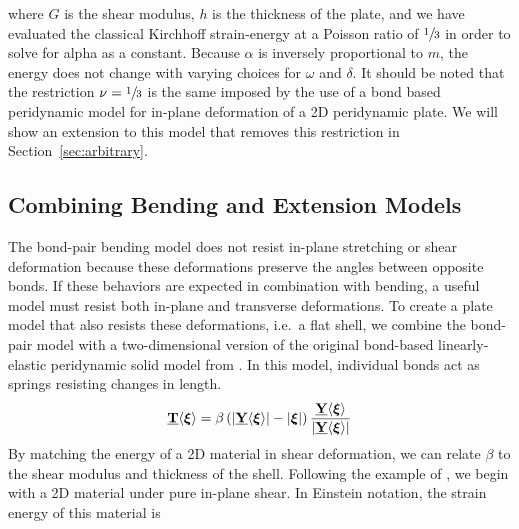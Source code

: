 %
where $G$ is the shear modulus, $h$ is the thickness of the plate, and we have evaluated the classical Kirchhoff strain-energy at a Poisson ratio of \(\sfrac{1}{3}\) in order to solve for alpha as a constant.  Because $\alpha$ is inversely proportional to $m$, the energy does not change with varying choices for $\omega$ and $\delta$. It should be noted that the restriction \(\nu=\sfrac{1}{3}\) is the same imposed by the use of a bond based peridynamic model for in-plane deformation of a 2D peridynamic plate. We will show an extension to this model that removes this restriction in Section~\ref{sec:arbitrary}.

\subsection{Combining Bending and Extension Models}
The bond-pair bending model does not resist in-plane stretching or shear deformation because these deformations preserve the angles between opposite bonds.  If these behaviors are expected in combination with bending, a useful model must resist both in-plane and transverse deformations.  To create a plate model that also resists these deformations, i.e.\ a flat shell, we combine the bond-pair model with a two-dimensional version of the original bond-based linearly-elastic peridynamic solid model from \cite{silling2000reformulation}.  In this model, individual bonds act as springs resisting changes in length.
%
\begin{equation}
    \label{eq:bondextension}
    \vstate{T}{}{\boldsymbol{\xi}} =\beta\left(|\vstate{Y}{}{\boldsymbol{\xi}}|-|\boldsymbol{\xi}|\right)\frac{\vstate{Y}{}{\boldsymbol{\xi}}}{|\vstate{Y}{}{\boldsymbol{\xi}}|}
\end{equation}
%
By matching the energy of a 2D material in shear deformation, we can relate \(\beta\) to the shear modulus and thickness of the shell.  Following the example of \cite{silling2007peridynamic}, we begin with a 2D material under pure in-plane shear.  In Einstein notation, the strain energy of this material is
%
